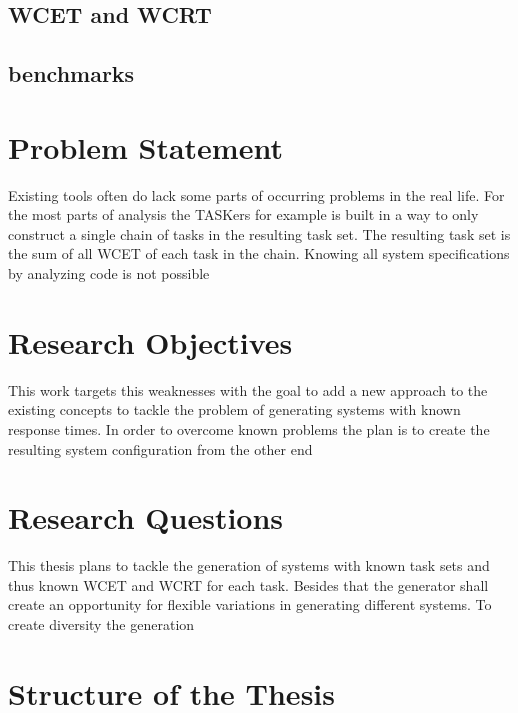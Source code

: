 \subsection{\ac{WCET} and \ac{WCRT}}


\subsection{benchmarks}


\section{Problem Statement}
Existing tools often do lack some parts of occurring problems in the real life.
For the most parts of analysis the  
TASKers \cite{eichler_taskers_2018} for example is built in a way to only construct a single chain of tasks in the resulting task set.
The resulting task set is the sum of all \ac{WCET} of each task in the chain.
Knowing all system specifications by analyzing code is not possible	\cite{}


\section{Research Objectives}
This work targets this weaknesses with the goal to add a new approach to the existing concepts to tackle the problem of generating systems with known response times.
In order to overcome known problems the plan is to create the resulting system configuration from the other end

\section{Research Questions}
This thesis plans to tackle the generation of systems with known task sets and thus known \ac{WCET} and \ac{WCRT} for each task.
Besides that the generator shall create an opportunity for flexible variations in generating different systems.
To create diversity the generation 

\section{Structure of the Thesis}

